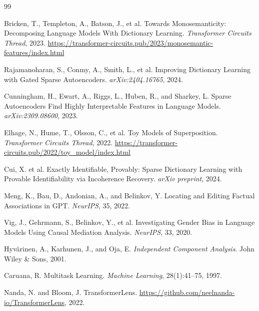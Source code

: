 \documentclass[12pt,a4paper]{article}
\begin{document}
\begin{thebibliography}{99}

Bricken, T., Templeton, A., Batson, J., et al.
\newblock Towards Monosemanticity: Decomposing Language Models With Dictionary Learning.
\newblock \emph{Transformer Circuits Thread}, 2023.
\newblock \url{https://transformer-circuits.pub/2023/monosemantic-features/index.html}

Rajamanoharan, S., Conmy, A., Smith, L., et al.
\newblock Improving Dictionary Learning with Gated Sparse Autoencoders.
\newblock \emph{arXiv:2404.16765}, 2024.

Cunningham, H., Ewart, A., Riggs, L., Huben, R., and Sharkey, L.
\newblock Sparse Autoencoders Find Highly Interpretable Features in Language Models.
\newblock \emph{arXiv:2309.08600}, 2023.

Elhage, N., Hume, T., Olsson, C., et al.
\newblock Toy Models of Superposition.
\newblock \emph{Transformer Circuits Thread}, 2022.
\newblock \url{https://transformer-circuits.pub/2022/toy_model/index.html}

Cui, X. et al.
\newblock Exactly Identifiable, Provably: Sparse Dictionary Learning with Provable Identifiability via Incoherence Recovery.
\newblock \emph{arXiv preprint}, 2024.

Meng, K., Bau, D., Andonian, A., and Belinkov, Y.
\newblock Locating and Editing Factual Associations in GPT.
\newblock \emph{NeurIPS}, 35, 2022.

Vig, J., Gehrmann, S., Belinkov, Y., et al.
\newblock Investigating Gender Bias in Language Models Using Causal Mediation Analysis.
\newblock \emph{NeurIPS}, 33, 2020.

Hyv\"arinen, A., Karhunen, J., and Oja, E.
\newblock \emph{Independent Component Analysis}.
\newblock John Wiley \& Sons, 2001.

Caruana, R.
\newblock Multitask Learning.
\newblock \emph{Machine Learning}, 28(1):41--75, 1997.

Nanda, N. and Bloom, J.
\newblock TransformerLens.
\newblock \url{https://github.com/neelnanda-io/TransformerLens}, 2022.

\end{thebibliography}
\end{document}
